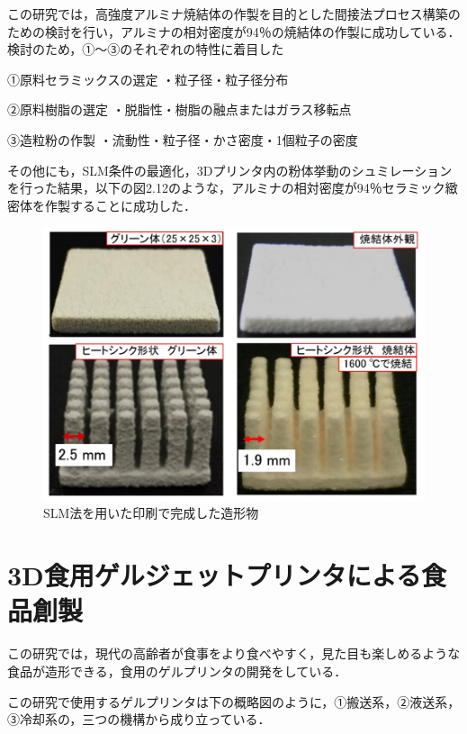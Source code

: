 この研究では，高強度アルミナ焼結体の作製を目的とした間接法プロセス構築のための検討を行い，アルミナの相対密度が94％の焼結体の作製に成功している．
検討のため，①～③のそれぞれの特性に着目した

①原料セラミックスの選定
・粒子径・粒子径分布

②原料樹脂の選定
・脱脂性・樹脂の融点またはガラス移転点

③造粒粉の作製
・流動性・粒子径・かさ密度・1個粒子の密度

その他にも，SLM条件の最適化，3Dプリンタ内の粉体挙動のシュミレーションを行った結果，以下の図2.12のような，アルミナの相対密度が94％セラミック緻密体を作製することに成功した．

\begin{figure}[H]
  \centering
  \includegraphics[width=11truecm]{./fig/seramikku.jpg}
  \caption{SLM法を用いた印刷で完成した造形物}
  \label{fig:ferret}
\end{figure}


\section{3D食用ゲルジェットプリンタによる食品創製\cite{i}}
\label{sec:enum}
この研究では，現代の高齢者が食事をより食べやすく，見た目も楽しめるような食品が造形できる，食用のゲルプリンタの開発をしている．

この研究で使用するゲルプリンタは下の概略図のように，①搬送系，②液送系，③冷却系の，三つの機構から成り立っている．

